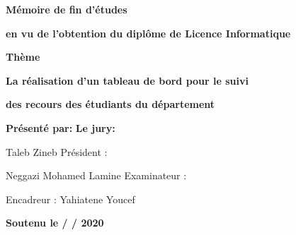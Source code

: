 \documentclass[12pt]{report}
\begin{document}
\begin{titlepage}
    \begin{center}
        \begin{large}

            \textbf{Mémoire de fin d'études}
        
            \textbf{en vu de l'obtention du diplôme de Licence Informatique}

        \end{large}

        \LARGE{\textbf{Thème}}

        \begin{mdframed}[style=MyFrame]
            \begin{center}
            \color{BlueViolet}
            \textbf{La réalisation d'un tableau de bord pour le suivi}

            \textbf{des recours des étudiants du département}
            \end{center}
        \end{mdframed}
    \end{center}

    \hspace{0.2in}
    \textbf{Présenté par:}
    \kern 3.652in
    \textbf{Le jury:}

    \hspace{0.2in}
    Taleb Zineb
    \kern 3.852in
    Président :

    \hspace{0.2in}
    Neggazi Mohamed Lamine
    \kern 2.632in
    Examinateur :

    \hfill
    Encadreur : Yahiatene Youcef

    \begin{center}
        \vspace{0.3in}
        \textbf{Soutenu le \qquad / \qquad / 2020}
    \end{center}

\end{titlepage}

\vspace*{0.1in}

\thispagestyle{empty}
\end{document}

